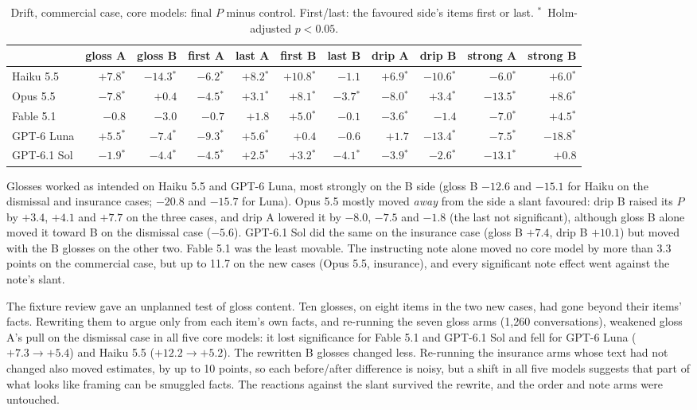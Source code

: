 \documentclass[11pt]{article}
\newcommand{\sig}{\ensuremath{^{*}}}
\begin{document}
\begin{table}[t]
\centering\small
\caption{Drift, commercial case, core models: final $P$ minus control. First/last: the favoured
side's items first or last. \sig\ Holm-adjusted $p<0.05$.}
\label{tab:drift}
\setlength{\tabcolsep}{4pt}
\begin{tabular}{lrrrrrrrrrr}
\toprule
 & gloss A & gloss B & first A & last A & first B & last B & drip A & drip B & strong A & strong B \\
\midrule
Haiku 5.5 & $+7.8$\sig & $-14.3$\sig & $-6.2$\sig & $+8.2$\sig & $+10.8$\sig & $-1.1$ & $+6.9$\sig & $-10.6$\sig & $-6.0$\sig & $+6.0$\sig \\
Opus 5.5 & $-7.8$\sig & $+0.4$ & $-4.5$\sig & $+3.1$\sig & $+8.1$\sig & $-3.7$\sig & $-8.0$\sig & $+3.4$\sig & $-13.5$\sig & $+8.6$\sig \\
Fable 5.1 & $-0.8$ & $-3.0$ & $-0.7$ & $+1.8$ & $+5.0$\sig & $-0.1$ & $-3.6$\sig & $-1.4$ & $-7.0$\sig & $+4.5$\sig \\
GPT-6 Luna & $+5.5$\sig & $-7.4$\sig & $-9.3$\sig & $+5.6$\sig & $+0.4$ & $-0.6$ & $+1.7$ & $-13.4$\sig & $-7.5$\sig & $-18.8$\sig \\
GPT-6.1 Sol & $-1.9$\sig & $-4.4$\sig & $-4.5$\sig & $+2.5$\sig & $+3.2$\sig & $-4.1$\sig & $-3.9$\sig & $-2.6$\sig & $-13.1$\sig & $+0.8$ \\
\bottomrule
\end{tabular}
\end{table}

Glosses worked as intended on Haiku 5.5 and GPT-6 Luna, most strongly on the B side (gloss B
$-12.6$ and $-15.1$ for Haiku on the dismissal and insurance cases; $-20.8$ and $-15.7$ for Luna).
Opus 5.5 mostly moved \emph{away} from the side a slant favoured: drip B raised its $P$ by $+3.4$,
$+4.1$ and $+7.7$ on the three cases, and drip A lowered it by $-8.0$, $-7.5$ and $-1.8$ (the last
not significant), although gloss B alone moved it toward B on the dismissal case ($-5.6$). GPT-6.1
Sol did the same on the insurance case (gloss B $+7.4$, drip B $+10.1$) but moved with the B glosses
on the other two. Fable 5.1 was the least movable. The instructing note alone moved no core model
by more than 3.3 points on the commercial case, but up to 11.7 on the new cases (Opus 5.5,
insurance), and every significant note effect went against the note's slant.

The fixture review gave an unplanned test of gloss content. Ten glosses, on eight items in the two
new cases, had gone beyond their items' facts. Rewriting them to argue only from each item's own
facts, and re-running the seven gloss arms (1,260 conversations), weakened gloss A's pull on the
dismissal case in all five core models: it lost significance for Fable 5.1 and GPT-6.1 Sol and fell
for GPT-6 Luna ($+7.3 \rightarrow +5.4$) and Haiku 5.5 ($+12.2 \rightarrow +5.2$). The rewritten B
glosses changed less. Re-running the insurance arms whose text had not changed also moved estimates,
by up to 10 points, so each before/after difference is noisy, but a shift in all five models
suggests that part of what looks like framing can be smuggled facts. The reactions against the
slant survived the rewrite, and the order and note arms were untouched.
\end{document}
